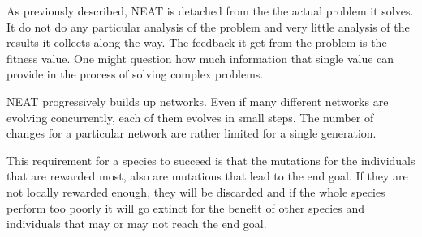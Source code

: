 
As previously described, NEAT is detached from the the actual problem it solves. It do not do any particular analysis of the problem and very little analysis of the results it collects along the way. The feedback it get from the problem is the fitness value. One might question how much information that single value can provide in the process of solving complex problems.

NEAT progressively builds up networks. Even if many different networks are evolving concurrently, each of them evolves in small steps. The number of changes for a particular network are rather limited for a single generation.

This requirement for a species to succeed is that the mutations for the individuals that are rewarded most, also are mutations that lead to the end goal. If they are not locally rewarded enough, they will be discarded and if the whole species perform too poorly it will go extinct for the benefit of other species and individuals that may or may not reach the end goal.

